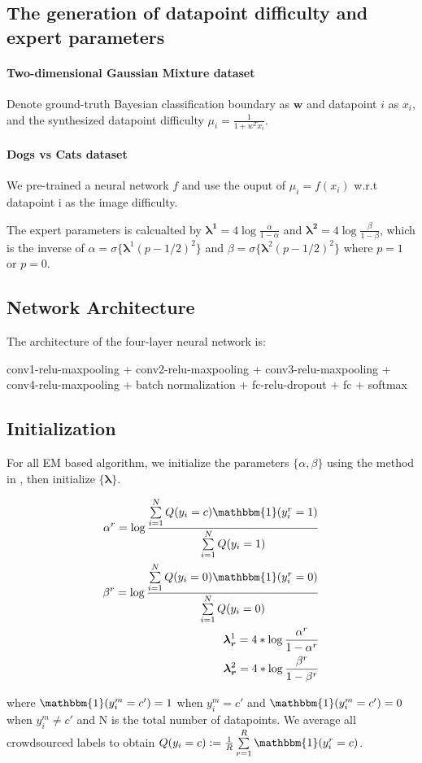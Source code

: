 \subsection{The generation of datapoint difficulty and expert parameters}

\paragraph{Two-dimensional Gaussian Mixture dataset} Denote ground-truth Bayesian classification boundary as $\bm{w}$ and datapoint $i$ as $x_i$, and the synthesized datapoint difficulty $\mu_i = \frac{1}{1+w^Tx_i}$.

\paragraph{Dogs vs Cats dataset} We pre-trained a neural network $f$ and use the ouput of $\mu_i = f(x_i)$ w.r.t datapoint i as the image difficulty.

The expert parameters is calcualted by $\bm{\lambda^1} = 4\log{\frac{\alpha}{1-\alpha}}$ and $\bm{\lambda^2} = 4\log{\frac{\beta}{1-\beta}}$, which is the inverse of $\alpha = \sigma\lbrace\bm{\lambda}^{1}(p-1/2)^{2}\rbrace$ and $\beta = \sigma\lbrace\bm{\lambda}^{2}(p-1/2)^{2}\rbrace$ where $p=1$ or $p = 0$.

\subsection{Network Architecture}

The  architecture of the four-layer neural network is:

conv1-relu-maxpooling + conv2-relu-maxpooling + conv3-relu-maxpooling + conv4-relu-maxpooling + batch normalization + fc-relu-dropout + fc + softmax

\subsection{Initialization} 

For all EM based algorithm, we initialize the parameters $\{\alpha,\beta\}$ using the method in \cite{raykar2010learning}, then initialize $\{\bm{\lambda}\}$.

\begin{align}\label{initial}
	\alpha^r = \log{\frac{\sum\limits_{i=1}^N Q(y_i=c)\mathbbm{1}(y_i^r=1)}{\sum\limits_{i=1}^N Q(y_i=1)}}\\
	\beta^r = \log{\frac{\sum\limits_{i=1}^N Q(y_i=0)\mathbbm{1}(y_i^r=0)}{\sum\limits_{i=1}^N Q(y_i=0)}}\\
	\bm{\lambda_r}^1 = 4* \log{\frac{\alpha^r}{1-\alpha^r}} \\
	\bm{\lambda_r}^2 = 4* \log{\frac{\beta^r}{1-\beta^r}}
\end{align}

where $\mathbbm{1}(y_i^m=c')=1$ when $y_i^m=c'$ and $\mathbbm{1}(y_i^m=c')=0$ when $y_i^m\neq c'$ and N is the total number of datapoints. We average all crowdsourced labels to obtain $Q(y_i=c) := \frac{1}{R}\sum\limits_{r=1}^R \mathbbm{1}(y_i^r=c)$.
